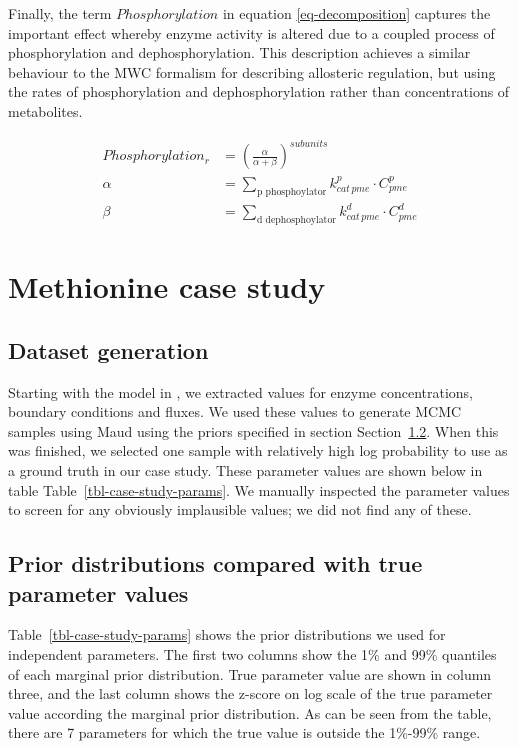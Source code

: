 \documentclass[journal=asbcd6,manuscript=article,layout=traditional]{achemso}
\begin{document}
Finally, the term \(Phosphorylation\) in equation
\eqref{eq-decomposition} captures the important effect whereby enzyme
activity is altered due to a coupled process of phosphorylation and
dephosphorylation. This description achieves a similar behaviour to the
MWC formalism for describing allosteric regulation, but using the rates
of phosphorylation and dephosphorylation rather than concentrations of
metabolites.

\begin{align}
Phosphorylation_r &= (\frac{\alpha}{\alpha + \beta})^{subunits} \label{eq-phosphorylation}\\
\alpha &= \sum_{\text{p phosphoylator}} k_{cat\,pme}^{p} \cdot C_{pme}^p \nonumber \\
\beta &= \sum_{\text{d dephosphoylator}} k_{cat\,pme}^{d} \cdot C_{pme}^d \nonumber 
\end{align}

\section{Methionine case study}\label{sec-methionine-case-study}

\subsection{Dataset generation}\label{dataset-generation}

Starting with the model in \citet{saa_construction_2016}, we extracted
values for enzyme concentrations, boundary conditions and fluxes. We
used these values to generate MCMC samples using Maud using the priors
specified in section Section~\ref{sec-methionine-priors}. When this was
finished, we selected one sample with relatively high log probability to
use as a ground truth in our case study. These parameter values are
shown below in table Table~\ref{tbl-case-study-params}. We manually
inspected the parameter values to screen for any obviously implausible
values; we did not find any of these.

\subsection{Prior distributions compared with true parameter
values}\label{sec-methionine-priors}

Table~\ref{tbl-case-study-params} shows the prior distributions we used
for independent parameters. The first two columns show the 1\% and 99\%
quantiles of each marginal prior distribution. True parameter value are
shown in column three, and the last column shows the z-score on log
scale of the true parameter value according the marginal prior
distribution. As can be seen from the table, there are 7 parameters for
which the true value is outside the 1\%-99\% range.
\end{document}
